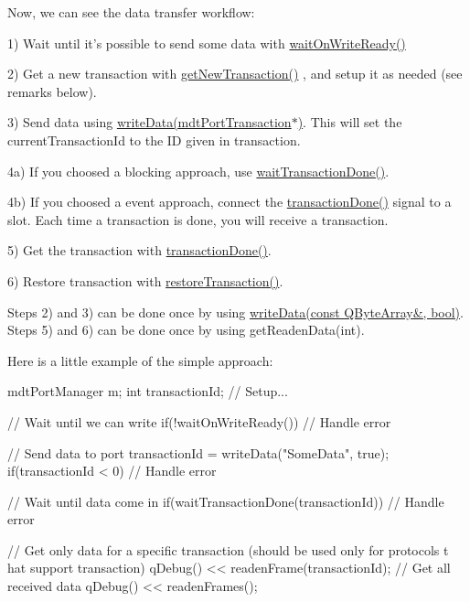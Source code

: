 Now, we can see the data transfer workflow:
\begin{DoxyItemize}
\item 1) Wait until it's possible to send some data with \hyperlink{classmdt_port_manager_a1ca92c5ac120d87e5b10bff54ed1aa5c}{waitOnWriteReady()}
\item 2) Get a new transaction with \hyperlink{classmdt_port_manager_a75ebd3d1859e3ed38b9558981e53aac4}{getNewTransaction()} , and setup it as needed (see remarks below).
\item 3) Send data using \hyperlink{classmdt_port_manager_a328abc7f5f2677c19ea11567df6597da}{writeData(mdtPortTransaction$\ast$)}. This will set the currentTransactionId to the ID given in transaction.
\item 4a) If you choosed a blocking approach, use \hyperlink{classmdt_port_manager_aaa8845faa91904dba625fe7f1d23bc51}{waitTransactionDone()}.
\item 4b) If you choosed a event approach, connect the \hyperlink{classmdt_port_manager_a5869bcf6774a86fb9d3b00a0d4211bb5}{transactionDone()} signal to a slot. Each time a transaction is done, you will receive a transaction.
\item 5) Get the transaction with \hyperlink{classmdt_port_manager_a5869bcf6774a86fb9d3b00a0d4211bb5}{transactionDone()}.
\item 6) Restore transaction with \hyperlink{classmdt_port_manager_a5fea4a9b8e94d38e8ec699dba05c7ca8}{restoreTransaction()}.
\end{DoxyItemize}

Steps 2) and 3) can be done once by using \hyperlink{classmdt_port_manager_a9b902a60c8b21585904bcb1d6e604369}{writeData(const QByteArray\&, bool)}. Steps 5) and 6) can be done once by using getReadenData(int).

Here is a little example of the simple approach: 
\begin{DoxyCode}
 mdtPortManager m;
 int transactionId;
 // Setup...

 // Wait until we can write
 if(!waitOnWriteReady()){
   // Handle error
 }

 // Send data to port
 transactionId = writeData("SomeData", true);
 if(transactionId < 0){
   // Handle error
 }

 // Wait until data come in
 if(waitTransactionDone(transactionId)){
   // Handle error
 }

 // Get only data for a specific transaction (should be used only for protocols t
      hat support transaction)
 qDebug() << readenFrame(transactionId);
 // Get all received data
 qDebug() << readenFrames();
\end{DoxyCode}


